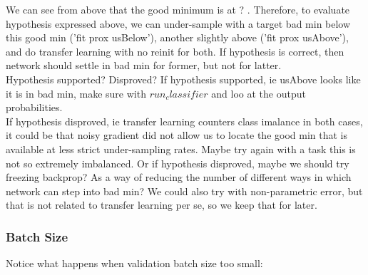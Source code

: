 \documentclass[a4paper,11pt]{article}
\begin{document}
We can see from above that the good minimum is at ? . Therefore, to evaluate hypothesis expressed above, we can under-sample with a target bad min below this good min ('fit prox usBelow'), another slightly above ('fit prox usAbove'), and do transfer learning with no reinit for both. If hypothesis is correct, then network should settle in bad min for former, but not for latter. \\



Hypothesis supported? Disproved? If hypothesis supported, ie usAbove looks like it is in bad min, make sure with $run_classifier$ and loo at the output probabilities. \\

If hypothesis disproved, ie transfer learning counters class imalance in both cases, it could be that noisy gradient did not allow us to locate the good min that is available at less strict under-sampling rates. Maybe try again with a task this is not so extremely imbalanced. 
Or if hypothesis disproved, maybe we should try freezing backprop? As a way of reducing the number of different ways in which network can step into bad min? 
We could also try with non-parametric error, but that is not related to transfer learning per se, so we keep that for later. \\



\subsubsection{Batch Size}

Notice what happens when validation batch size too small:
\end{document}
